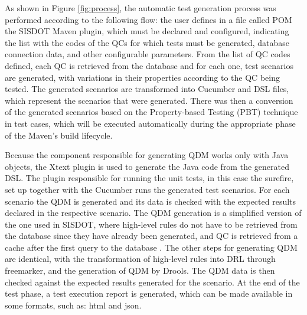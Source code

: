 \documentclass[AMA,STIX1COL]{WileyNJD-v2}
\begin{document}
As shown in Figure \ref{fig:process}, the automatic test generation process was performed according to the following flow: the user defines in a file called POM the SISDOT Maven plugin, which must be declared and configured, indicating the list with the codes of the QCs for which tests must be generated, database connection data, and other configurable parameters. From the list of QC codes defined, each QC is retrieved from the database and for each one, test scenarios are generated, with variations in their properties according to the QC being tested. The generated scenarios are transformed into Cucumber and DSL files, which represent the scenarios that were generated. There was then a conversion of the generated scenarios based on the Property-based Testing (PBT) technique in test cases, which will be executed automatically during the appropriate phase of the Maven's build lifecycle.


Because the component responsible for generating QDM works only with Java objects, the Xtext plugin is used to generate the Java code from the generated DSL. The plugin responsible for running the unit tests, in this case the surefire, set up together with the Cucumber runs the generated test scenarios. For each scenario the QDM is generated and its data is checked with the expected results declared in the respective scenario. The QDM generation is a simplified version of the one used in SISDOT, where high-level rules do not have to be retrieved from the database since they have already been generated, and QC is retrieved from a cache after the first query to the database . The other steps for generating QDM are identical, with the transformation of high-level rules into DRL through freemarker, and the generation of QDM by Drools. The QDM data is then checked against the expected results generated for the scenario. At the end of the test phase, a test execution report is generated, which can be made available in some formats, such as: html and json.
\end{document}
